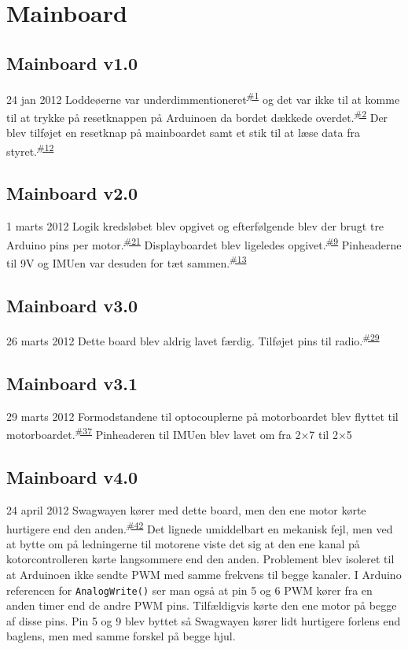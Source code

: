 \documentclass[a4paper,oneside,article,danish,table]{memoir}
\newcommand{\boarddate}[1]{\textcolor{blue!80!black}{#1}}
\newcommand{\issue}[1]{\textsuperscript{\textcolor{blue!80!black}{\href{https://github.com/neic/Swagway/issues/#1}{\##1}}}}
\begin{document}
\section{Mainboard}

\subsection{Mainboard v1.0}
\boarddate{24 jan 2012}
Loddeøerne var underdimmentioneret\issue{1} og det var ikke til at komme til at trykke på resetknappen på Arduinoen da bordet dækkede overdet.\issue{2} Der blev tilføjet en resetknap på mainboardet samt et stik til at læse data fra styret.\issue{12}

\subsection{Mainboard v2.0}
\boarddate{1 marts 2012}
Logik kredsløbet blev opgivet og efterfølgende blev der brugt tre Arduino pins per motor.\issue{21} Displayboardet blev ligeledes opgivet.\issue{9} Pinheaderne til 9V og IMUen var desuden for tæt sammen.\issue{13}

\subsection{Mainboard v3.0}
\boarddate{26 marts 2012} Dette board blev aldrig lavet færdig.
Tilføjet pins til radio.\issue{29}

\subsection{Mainboard v3.1}
\boarddate{29 marts 2012}
Formodstandene til optocouplerne på motorboardet blev flyttet til motorboardet.\issue{37}
Pinheaderen til IMUen blev lavet om fra 2×7 til 2×5

\subsection{Mainboard v4.0}\label{sec:main40}
\boarddate{24 april 2012}
Swagwayen kører med dette board, men den ene motor kørte hurtigere end den anden.\issue{42} Det lignede umiddelbart en mekanisk fejl, men ved at bytte om på ledningerne til motorene viste det sig at den ene kanal på kotorcontrolleren kørte langsommere end den anden. Problement blev isoleret til at Arduinoen ikke sendte PWM med samme frekvens til begge kanaler. I Arduino referencen for \texttt{AnalogWrite()} ser man også at pin 5 og 6 PWM kører fra en anden timer end de andre PWM pins. Tilfældigvis kørte den ene motor på begge af disse pins. Pin 5 og 9 blev byttet så Swagwayen kører lidt hurtigere forlens end baglens, men med samme forskel på begge hjul.
\end{document}
